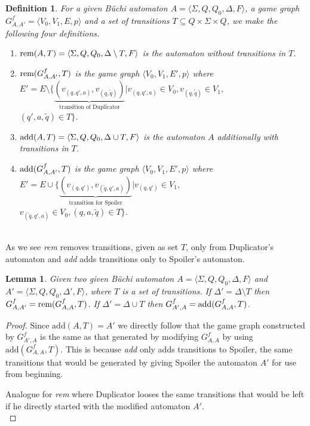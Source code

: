 \documentclass[12pt,oneside,bibliography=totoc,abstracton]{scrartcl}
\newtheorem{mydef}{Definition}
\newtheorem{mylemma}{Lemma}
\begin{document}
\begin{mydef}
	For a given Büchi automaton $A = \langle\Sigma, Q , Q_0, \Delta, F\rangle$, a game graph
	$G^f_{A, A'} = \langle V_0, V_1, E, p\rangle$ and a set of transitions
	$T \subseteq Q \times \Sigma \times Q$, we make the following four definitions.
	\begin{enumerate}
		\item $\textnormal{rem}(A, T) = \langle\Sigma, Q , Q_0, \Delta \setminus T, F\rangle$ is the
			automaton without transitions in $T$.
		\item $\textnormal{rem}(G^f_{A, A'}, T)$ is the game graph $\langle V_0, V_1, E', p\rangle$ where
			\subitem $E' = E \setminus \{\underbrace{\left(v_{(q, q', a)}, v_{(q, \tilde{q})}\right)}_{\text{transition of Duplicator}}
				| v_{(q, q', a)} \in V_0, v_{(q, \tilde{q})} \in V_1,$\\
				\subsubitem $(q', a, \tilde{q}) \in T\}$.
		\item $\textnormal{add}(A, T) = \langle\Sigma, Q , Q_0, \Delta \cup T, F\rangle$ is the automaton $A$
			additionally with transitions in $T$.
		\item $\textnormal{add}(G^f_{A, A'}, T)$ is the game graph $\langle V_0, V_1, E', p\rangle$ where
			\subitem $E' = E \cup \{\underbrace{\left(v_{(q, q')}, v_{(\tilde{q}, q', a)}\right)}_{\text{transition for Spoiler}}
				| v_{(q, q')} \in V_1,$\\
				\subsubitem $v_{(\tilde{q}, q', a)} \in V_0, (q, a, \tilde{q}) \in T\}$.
	\end{enumerate}
\end{mydef}\quad\\
As we see \textit{rem} removes transitions, given as set $T$, only from Duplicator's automaton
and \textit{add} adds transitions only to Spoiler's automaton.
\begin{mylemma}\label{lemma_modfiedgraph}
	Given two given Büchi automaton $A = \langle\Sigma, Q , Q_0, \Delta, F\rangle$ and $A' = \langle\Sigma, Q , Q_0, \Delta', F\rangle$,
	where $T$ is a set of transitions.
	If $\Delta' = \Delta \setminus T$ then $G^f_{A, A'} = \textnormal{rem}(G^f_{A, A}, T)$.
	If $\Delta' = \Delta \cup T$ then  $G^f_{A', A} = \textnormal{add}(G^f_{A, A}, T)$.
\end{mylemma}
\begin{proof}
	Since $\text{add}(A, T) = A'$ we directly follow that the game graph constructed by $G^f_{A', A}$ is the same as that generated
	by modifying $G^f_{A, A}$ by using $\text{add}(G^f_{A, A}, T)$. This is because \textit{add} only adds transitions to Spoiler,
	the same transitions that would be generated by giving Spoiler the automaton $A'$ for use from beginning.
	
	Analogue for \textit{rem} where Duplicator looses the same transitions that would be left if he directly started with
	the modified automaton $A'$.\\
\end{proof}
\end{document}
